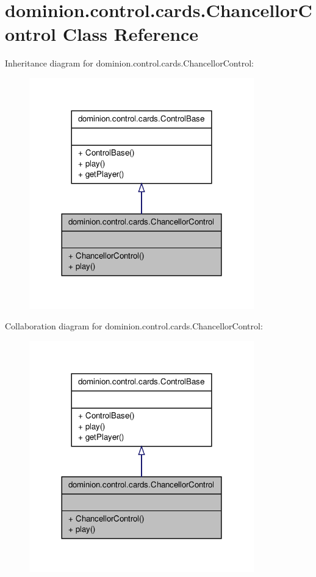 \hypertarget{classdominion_1_1control_1_1cards_1_1ChancellorControl}{\section{dominion.\-control.\-cards.\-Chancellor\-Control \-Class \-Reference}
\label{classdominion_1_1control_1_1cards_1_1ChancellorControl}
}


\-Inheritance diagram for dominion.\-control.\-cards.\-Chancellor\-Control\-:
\nopagebreak
\begin{figure}[H]
\begin{center}
\leavevmode
\includegraphics[width=276pt]{classdominion_1_1control_1_1cards_1_1ChancellorControl__inherit__graph}
\end{center}
\end{figure}


\-Collaboration diagram for dominion.\-control.\-cards.\-Chancellor\-Control\-:
\nopagebreak
\begin{figure}[H]
\begin{center}
\leavevmode
\includegraphics[width=276pt]{classdominion_1_1control_1_1cards_1_1ChancellorControl__coll__graph}
\end{center}
\end{figure}
